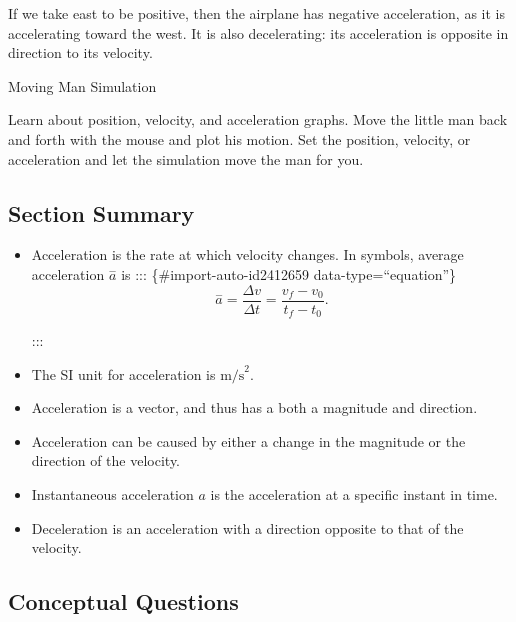 \documentclass[
]{book}
\begin{document}
\leavevmode{}%
If we take east to be positive, then the airplane has negative
acceleration, as it is accelerating toward the west. It is also
decelerating: its acceleration is opposite in direction to its velocity.

\hypertarget{fs-id4128084}{}
Moving Man Simulation

Learn about position, velocity, and acceleration graphs. Move the little
man back and forth with the mouse and plot his motion. Set the position,
velocity, or acceleration and let the simulation move the man for you.
{\hfill\break
}

\hypertarget{MovingMan}{}

\hypertarget{fs-id4131829-summary}{}
\hypertarget{section-summary-3}{%
\subsection{Section Summary}\label{section-summary-3}}

\begin{itemize}
\item
  \protect\hypertarget{import-auto-id2412645}{}{Acceleration is the rate at which velocity changes. In symbols,
  {average acceleration} \(\overset{-}{a}{}\)
  is}
  ::: \{\#import-auto-id2412659 data-type=``equation''\}
  \[{{{\overset{-}{a} = \frac{\Delta v}{\Delta t}} = \frac{v_{f} - v_{0}}{t_{f} - t_{0}}}\text{.}}{}\]

  :::
\item
  \protect\hypertarget{import-auto-id2412738}{}{The SI unit for acceleration is
  \(\text{m/s}^{2}{}\).}
\item
  \protect\hypertarget{import-auto-id2412758}{}{Acceleration is a vector, and thus has a both a magnitude and
  direction.}
\item
  \protect\hypertarget{import-auto-id2412770}{}{Acceleration can be caused by either a change in the magnitude or
  the direction of the velocity.}
\item
  \protect\hypertarget{import-auto-id2412772}{}{Instantaneous acceleration \(a{}\) is the acceleration at a specific
  instant in time.}
\item
  \protect\hypertarget{import-auto-id2412729}{}{Deceleration is an acceleration with a direction opposite to that
  of the velocity.}
\end{itemize}

\hypertarget{fs-id3526388}{}
\hypertarget{conceptual-questions-3}{%
\subsection{Conceptual Questions}\label{conceptual-questions-3}}
\end{document}
